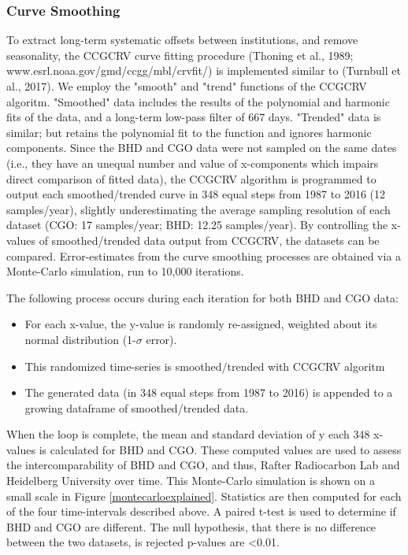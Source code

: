 \subsubsection{Curve Smoothing}
To extract long-term systematic offsets between institutions, and remove seasonality, the CCGCRV curve fitting procedure (Thoning et al., 1989; www.esrl.noaa.gov/gmd/ccgg/mbl/crvfit/) is implemented similar to (Turnbull et al., 2017). We employ the "smooth" and "trend" functions of the CCGCRV algoritm. "Smoothed" data includes the results of the polynomial and harmonic fits of the data, and a long-term low-pass filter of 667 days. "Trended" data is similar; but retains the polynomial fit to the function and ignores harmonic components. 
Since the BHD and CGO data were not sampled on the same dates (i.e., they have an unequal number and value of x-components which impairs direct comparison of fitted data), the CCGCRV algorithm is programmed to output each smoothed/trended curve in 348 equal steps from 1987 to 2016 (12 samples/year), slightly underestimating the average sampling resolution of each dataset (CGO: 17 samples/year; BHD: 12.25 samples/year). By controlling the x-values of smoothed/trended data output from CCGCRV, the datasets can be compared. 
Error-estimates from the curve smoothing processes are obtained via a Monte-Carlo simulation, run to 10,000 iterations. 

The following process occurs during each iteration for both BHD and CGO data: 
\begin{itemize}
	\item For each x-value, the y-value is  randomly re-assigned, weighted about its normal distribution (1-${\sigma}$ error). 
	\item This randomized time-series is smoothed/trended with CCGCRV algoritm 
	\item The generated data (in 348 equal steps from 1987 to 2016) is appended to a growing dataframe of smoothed/trended data.
\end{itemize}
When the loop is complete, the mean and standard deviation of y each 348 x-values is calculated for BHD and CGO. These computed values are used to assess the intercomparability of BHD and CGO, and thus, Rafter Radiocarbon Lab and Heidelberg University over time. This Monte-Carlo simulation is shown on a small scale in Figure \ref{montecarloexplained}. Statistics are then computed for each of the four time-intervals described above. A paired t-test is used to determine if BHD and CGO are different. The null hypothesis, that there is no difference between the two datasets, is rejected p-values are <0.01. 

